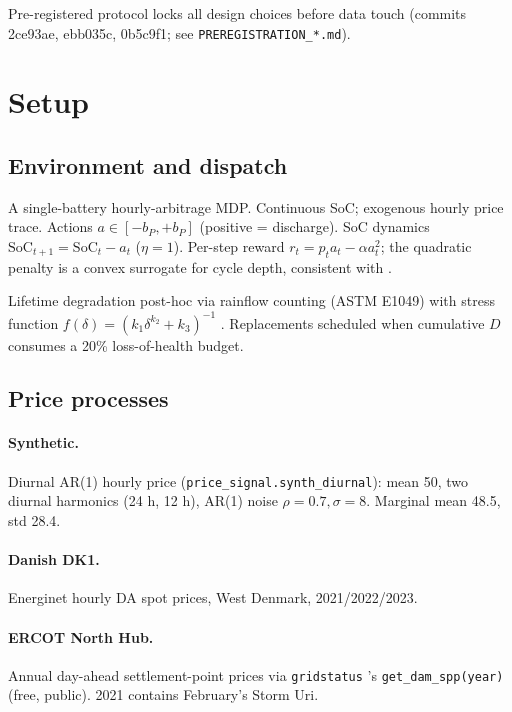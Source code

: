 \documentclass[11pt]{article}
\begin{document}
Pre-registered protocol locks all design choices before data touch (commits 2ce93ae, ebb035c, 0b5c9f1; see \texttt{PREREGISTRATION\_*.md}).

\section{Setup}\label{sec:setup}

\subsection{Environment and dispatch}

A single-battery hourly-arbitrage MDP. Continuous SoC; exogenous hourly price trace. Actions $a \in [-b_P, +b_P]$ (positive = discharge). SoC dynamics $\mathrm{SoC}_{t+1} = \mathrm{SoC}_t - a_t$ ($\eta = 1$). Per-step reward $r_t = p_t a_t - \alpha a_t^2$; the quadratic penalty is a convex surrogate for cycle depth, consistent with \citet{shi2017convex}.

Lifetime degradation post-hoc via rainflow counting (ASTM E1049) with stress function $f(\delta) = (k_1 \delta^{k_2} + k_3)^{-1}$ \citep{xu2018modeling}. Replacements scheduled when cumulative $D$ consumes a 20\% loss-of-health budget.

\subsection{Price processes}

\paragraph{Synthetic.} Diurnal AR(1) hourly price (\texttt{price\_signal.synth\_diurnal}): mean 50, two diurnal harmonics (24 h, 12 h), AR(1) noise $\rho = 0.7, \sigma = 8$. Marginal mean 48.5, std 28.4.

\paragraph{Danish DK1.} Energinet \citep{energinet2024} hourly DA spot prices, West Denmark, 2021/2022/2023.

\paragraph{ERCOT North Hub.} Annual day-ahead settlement-point prices via \texttt{gridstatus} \citep{gridstatus2024}'s \texttt{get\_dam\_spp(year)} (free, public). 2021 contains February's Storm Uri.
\end{document}
